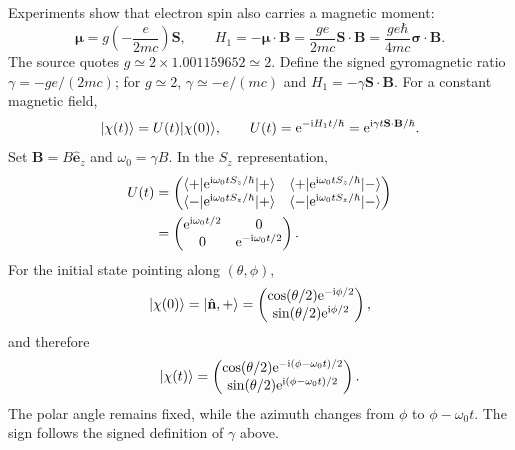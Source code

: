 Experiments show that electron spin also carries a magnetic moment:
\[
 \boldsymbol\mu=g\left(-\frac e{2mc}\right)\mathbf S,
 \qquad
 H_1=-\boldsymbol\mu\cdot\mathbf B
   =\frac{ge}{2mc}\mathbf S\cdot\mathbf B
   =\frac{ge\hbar}{4mc}\boldsymbol\sigma\cdot\mathbf B.
\]
The source quotes $g\simeq2\times1.001159652\simeq2$. Define the signed
gyromagnetic ratio $\gamma=-ge/(2mc)$; for $g\simeq2$,
$\gamma\simeq-e/(mc)$ and $H_1=-\gamma\mathbf S\cdot\mathbf B$.
For a constant magnetic field,
\[
 \lvert \chi(t)\rangle=U(t)\lvert \chi(0)\rangle,\qquad
 U(t)=\mathrm{e}^{-\mathrm{i} H_1t/\hbar}
     =\mathrm{e}^{\mathrm{i}\gamma t\mathbf S\cdot\mathbf B/\hbar}.
\]
Set $\mathbf B=B\hat{\mathbf e}_z$ and $\omega_0=\gamma B$. In the
$S_z$ representation,
\begin{align*}
 U(t)&=\begin{pmatrix}
 \langle +\rvert \mathrm{e}^{\mathrm{i}\omega_0tS_z/\hbar}\lvert +\rangle&
 \langle +\rvert \mathrm{e}^{\mathrm{i}\omega_0tS_z/\hbar}\lvert -\rangle\\
 \langle -\rvert \mathrm{e}^{\mathrm{i}\omega_0tS_z/\hbar}\lvert +\rangle&
 \langle -\rvert \mathrm{e}^{\mathrm{i}\omega_0tS_z/\hbar}\lvert -\rangle
 \end{pmatrix}\\
 &=\begin{pmatrix}\mathrm{e}^{\mathrm{i}\omega_0t/2}&0\\0&\mathrm{e}^{-\mathrm{i}\omega_0t/2}\end{pmatrix}.
\end{align*}
For the initial state pointing along $(\theta,\phi)$,
\[
 \lvert \chi(0)\rangle=\lvert \hat{\mathbf n},+\rangle
 =\begin{pmatrix}\cos(\theta/2)\mathrm{e}^{-\mathrm{i}\phi/2}\\
                   \sin(\theta/2)\mathrm{e}^{\mathrm{i}\phi/2}\end{pmatrix},
\]
and therefore
\[
 \lvert \chi(t)\rangle=
 \begin{pmatrix}\cos(\theta/2)\mathrm{e}^{-\mathrm{i}(\phi-\omega_0t)/2}\\
                 \sin(\theta/2)\mathrm{e}^{\mathrm{i}(\phi-\omega_0t)/2}\end{pmatrix}.
\]
The polar angle remains fixed, while the azimuth changes from $\phi$ to
$\phi-\omega_0t$. The sign follows the signed definition of $\gamma$ above.
